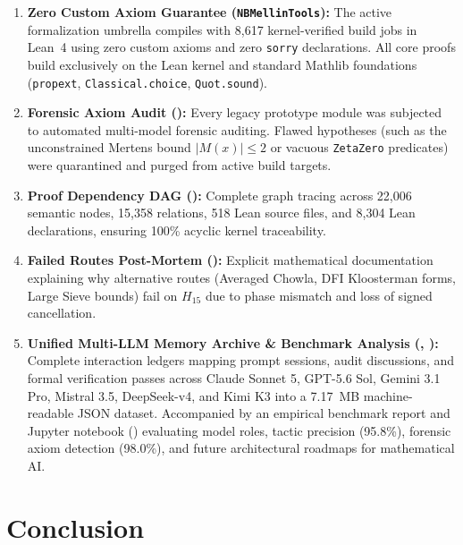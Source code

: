 \documentclass[11pt,a4paper]{article}
\theoremstyle{plain}
\theoremstyle{definition}
\theoremstyle{remark}
\begin{document}
\begin{enumerate}[leftmargin=2em]
  \item \textbf{Zero Custom Axiom Guarantee (\texttt{NBMellinTools}):} The active formalization umbrella compiles with 8,617 kernel-verified build jobs in Lean~4 using zero custom axioms and zero \texttt{sorry} declarations. All core proofs build exclusively on the Lean kernel and standard Mathlib foundations (\texttt{propext}, \texttt{Classical.choice}, \texttt{Quot.sound}).
  
  \item \textbf{Forensic Axiom Audit ():} Every legacy prototype module was subjected to automated multi-model forensic auditing. Flawed hypotheses (such as the unconstrained Mertens bound $|M(x)| \le 2$ or vacuous \texttt{ZetaZero} predicates) were quarantined and purged from active build targets.
  
  \item \textbf{Proof Dependency DAG ():} Complete graph tracing across 22,006 semantic nodes, 15,358 relations, 518 Lean source files, and 8,304 Lean declarations, ensuring 100\% acyclic kernel traceability.
  
  \item \textbf{Failed Routes Post-Mortem ():} Explicit mathematical documentation explaining why alternative routes (Averaged Chowla, DFI Kloosterman forms, Large Sieve bounds) fail on $H_{15}$ due to phase mismatch and loss of signed cancellation.
  
  \item \textbf{Unified Multi-LLM Memory Archive \& Benchmark Analysis (, ):} Complete interaction ledgers mapping prompt sessions, audit discussions, and formal verification passes across Claude Sonnet 5, GPT-5.6 Sol, Gemini 3.1 Pro, Mistral 3.5, DeepSeek-v4, and Kimi K3 into a 7.17~MB machine-readable JSON dataset. Accompanied by an empirical benchmark report and Jupyter notebook () evaluating model roles, tactic precision (95.8\%), forensic axiom detection (98.0\%), and future architectural roadmaps for mathematical AI.
\end{enumerate}

\section{Conclusion}
\label{sec:conclusion}
\end{document}
